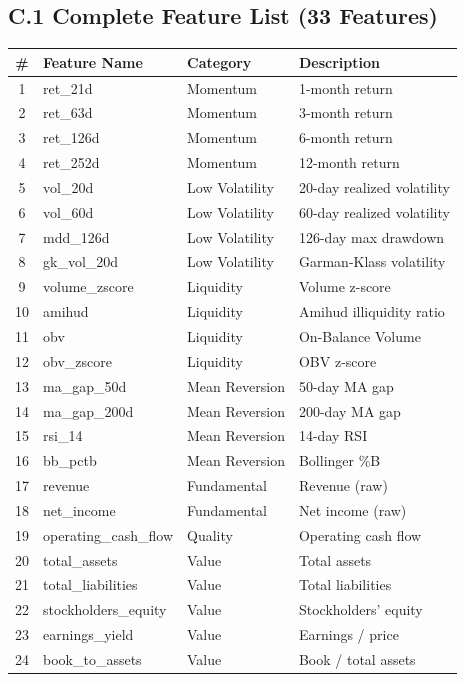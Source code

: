 \documentclass[11pt, a4paper]{article}
\begin{document}
\subsection*{C.1 Complete Feature List (33 Features)}
\small
\begin{longtable}{clll}
\toprule
\textbf{\#} & \textbf{Feature Name} & \textbf{Category} & \textbf{Description} \\
\midrule
\endhead
1 & ret\_21d & Momentum & 1-month return \\
2 & ret\_63d & Momentum & 3-month return \\
3 & ret\_126d & Momentum & 6-month return \\
4 & ret\_252d & Momentum & 12-month return \\
5 & vol\_20d & Low Volatility & 20-day realized volatility \\
6 & vol\_60d & Low Volatility & 60-day realized volatility \\
7 & mdd\_126d & Low Volatility & 126-day max drawdown \\
8 & gk\_vol\_20d & Low Volatility & Garman-Klass volatility \\
9 & volume\_zscore & Liquidity & Volume z-score \\
10 & amihud & Liquidity & Amihud illiquidity ratio \\
11 & obv & Liquidity & On-Balance Volume \\
12 & obv\_zscore & Liquidity & OBV z-score \\
13 & ma\_gap\_50d & Mean Reversion & 50-day MA gap \\
14 & ma\_gap\_200d & Mean Reversion & 200-day MA gap \\
15 & rsi\_14 & Mean Reversion & 14-day RSI \\
16 & bb\_pctb & Mean Reversion & Bollinger \%B \\
17 & revenue & Fundamental & Revenue (raw) \\
18 & net\_income & Fundamental & Net income (raw) \\
19 & operating\_cash\_flow & Quality & Operating cash flow \\
20 & total\_assets & Value & Total assets \\
21 & total\_liabilities & Value & Total liabilities \\
22 & stockholders\_equity & Value & Stockholders' equity \\
23 & earnings\_yield & Value & Earnings / price \\
24 & book\_to\_assets & Value & Book / total assets \\

\end{longtable}
\end{document}
